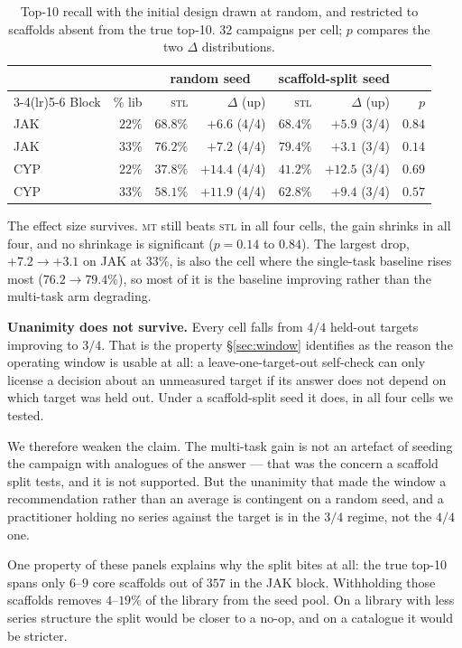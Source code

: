 \documentclass[11pt]{article}
\newcommand{\stl}{\textsc{stl}}
\newcommand{\mt}{\textsc{mt}}
\begin{document}
\begin{table}[ht]
\centering\small
\begin{tabular}{lrrrrrr}
\toprule
 & & \multicolumn{2}{c}{random seed} & \multicolumn{2}{c}{scaffold-split seed} & \\
\cmidrule(lr){3-4}\cmidrule(lr){5-6}
Block & \% lib & \stl{} & $\Delta$ (up) & \stl{} & $\Delta$ (up) & $p$ \\
\midrule
JAK & $22\%$ & $68.8\%$ & $+6.6$ (4/4) & $68.4\%$ & $+5.9$ (3/4) & $0.84$ \\
JAK & $33\%$ & $76.2\%$ & $+7.2$ (4/4) & $79.4\%$ & $+3.1$ (3/4) & $0.14$ \\
CYP & $22\%$ & $37.8\%$ & $+14.4$ (4/4) & $41.2\%$ & $+12.5$ (3/4) & $0.69$ \\
CYP & $33\%$ & $58.1\%$ & $+11.9$ (4/4) & $62.8\%$ & $+9.4$ (3/4) & $0.57$ \\
\bottomrule
\end{tabular}
\caption{Top-10 recall with the initial design drawn at random, and restricted
to scaffolds absent from the true top-10. 32 campaigns per cell; $p$ compares
the two $\Delta$ distributions.}
\label{tab:scaffold}
\end{table}

The effect size survives. \mt{} still beats \stl{} in all four cells, the gain
shrinks in all four, and no shrinkage is significant ($p = 0.14$ to $0.84$).
The largest drop, $+7.2 \to +3.1$ on JAK at $33\%$, is also the cell where the
single-task baseline rises most ($76.2 \to 79.4\%$), so most of it is the
baseline improving rather than the multi-task arm degrading.

\textbf{Unanimity does not survive.} Every cell falls from $4/4$ held-out
targets improving to $3/4$. That is the property \S\ref{sec:window} identifies
as the reason the operating window is usable at all: a leave-one-target-out
self-check can only license a decision about an unmeasured target if its answer
does not depend on which target was held out. Under a scaffold-split seed it
does, in all four cells we tested.

We therefore weaken the claim. The multi-task gain is not an artefact of seeding
the campaign with analogues of the answer --- that was the concern a scaffold
split tests, and it is not supported. But the unanimity that made the window a
recommendation rather than an average is contingent on a random seed, and a
practitioner holding no series against the target is in the $3/4$ regime, not
the $4/4$ one.

One property of these panels explains why the split bites at all: the true
top-10 spans only $6$--$9$ core scaffolds out of $357$ in the JAK
block. Withholding those scaffolds removes $4$--$19\%$ of the library from the
seed pool. On a library with less series structure the split would be closer to
a no-op, and on a catalogue it would be stricter.
\end{document}
